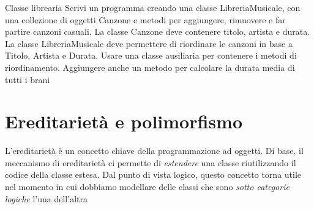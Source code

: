 \begin{esercizio}{Classe librearia}
	Scrivi un programma creando una classe {\ttfamily LibreriaMusicale}, con una collezione di oggetti {\ttfamily Canzone} e metodi per aggiungere, rimuovere e far partire canzoni casuali. La classe {\ttfamily Canzone} deve contenere titolo, artista e durata. La classe {\ttfamily LibreriaMusicale} deve permettere di riordinare le canzoni in base a Titolo, Artista e Durata. Usare una classe ausiliaria per contenere i metodi di riordinamento. Aggiungere anche un metodo per calcolare la durata media di tutti i brani

\end{esercizio}

\section{Ereditarietà e polimorfismo}
L'ereditarietà è un concetto chiave della programmazione ad oggetti. Di base, il meccanismo di ereditarietà ci permette di \textit{estendere} una classe riutilizzando il codice della classe estesa.
\vskip3mm
Dal punto di vista logico, questo concetto torna utile nel momento in cui dobbiamo modellare delle classi che sono \textit{sotto categorie logiche} l'una dell'altra
\vskip3mm
